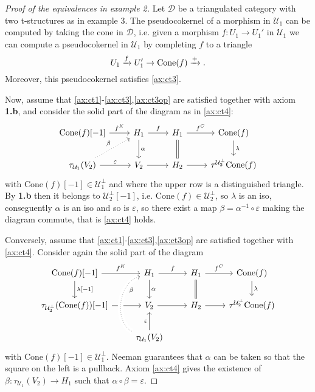 \begin{proof}[Proof of the equivalences in example 2]
  Let $\mathcal{D}$ be a triangulated category with two t-structures as in example 3. The pseudocokernel
  of a morphism in $\mathcal{U}_1$ can be computed by taking the cone in $\mathcal{D}$, i.e. given a morphism
  $f:U_1\to U_1'$ in $\mathcal{U}_1$ we can compute a pseudocokernel in $\mathcal{U}_1$ by completing $f$
  to a triangle
  \begin{equation*}
    U_1\xrightarrow{f}U_1'\to \mathrm{Cone}(f)\xrightarrow{+}.
  \end{equation*}
  Moreover, this pseudocokernel satisfies \ref{ax:ct3}.

  Now, assume that \ref{ax:ct1}-\ref{ax:ct3},\ref{ax:ct3op} are satisfied together with axiom
  \textbf{1.b}, and consider the solid part of the diagram as in \ref{ax:ct4}:
  \begin{equation*}
    \begin{tikzcd}
      \mathrm{Cone}(f)[-1]\arrow{r}{f^K}
        & H_1\arrow{r}{f}\arrow{d}{\alpha}
          & H_1\arrow{r}{f^C}\arrow[equal]{d}
            & \mathrm{Cone}(f)\arrow{d}{\lambda}\\
      \tau_{\mathcal{U}_1}(V_2)\arrow{r}{\varepsilon}\arrow[dotted]{ur}{\beta}
        & V_2\arrow{r}
          & H_2\arrow{r}
            & \tau^{\mathcal{U}_2^\perp}\mathrm{Cone}(f)
    \end{tikzcd}
  \end{equation*}
  with $\mathrm{Cone}(f)[-1]\in\mathcal{U}_1^\perp$ and where the upper row is a
  distinguished triangle. By \textbf{1.b} then it belongs
  to $\mathcal{U}_2^\perp[-1]$, i.e. $\mathrm{Cone}(f)\in\mathcal{U}_2^\perp$, so
  $\lambda$ is an iso, conseguently $\alpha$ is an iso and so is $\varepsilon$, so
  there exist a map $\beta=\alpha^{-1}\circ\varepsilon$ making the diagram commute, that
  is \ref{ax:ct4} holds.

  Conversely, assume that \ref{ax:ct1}-\ref{ax:ct3},\ref{ax:ct3op} are satisfied together with
  \ref{ax:ct4}. Consider again the solid part of the diagram
  \begin{equation*}
    \begin{tikzcd}
      \mathrm{Cone}(f)[-1]\arrow{r}{f^K}\arrow{d}{\lambda[-1]}
        & H_1\arrow{r}{f}\arrow{d}{\alpha}
          & H_1\arrow{r}{f^C}\arrow[equal]{d}
            & \mathrm{Cone}(f)\arrow{d}{\lambda}\\
      \tau_{\mathcal{U}_2^\perp}(\mathrm{Cone}(f))[-1]\arrow{r}
        & V_2\arrow{r}
          & H_2\arrow{r}
            & \tau^{\mathcal{U}_2^\perp}\mathrm{Cone}(f)\\
        & \tau_{\mathcal{U}_1}(V_2)\arrow{u}{\varepsilon}\arrow[dotted, crossing over, bend left=70]{uu}[near end,']{\beta}
        & &
    \end{tikzcd}
  \end{equation*}
  with $\mathrm{Cone}(f)[-1]\in\mathcal{U}_1^\perp$. Neeman  guarantees
  that $\alpha$ can be taken so that the square on the left is a pullback. Axiom \ref{ax:ct4}
  gives the existence of $\beta:\tau_{\mathcal{U}_1}(V_2)\to H_1$ such that $\alpha\circ\beta=\varepsilon$.


\end{proof}
